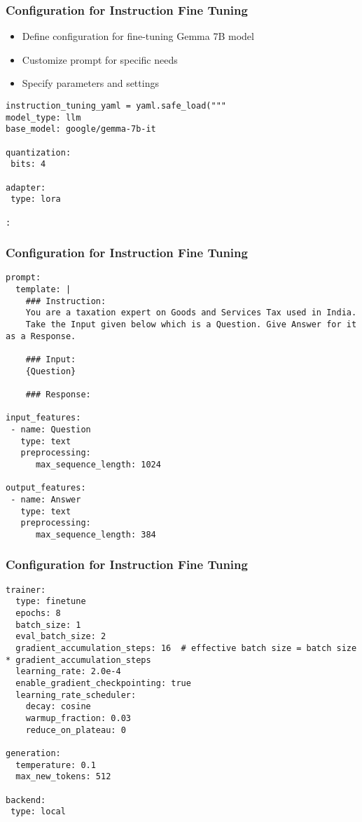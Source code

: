 \begin{frame}[fragile]\frametitle{Configuration for Instruction Fine Tuning}
\begin{itemize}
\item Define configuration for fine-tuning Gemma 7B model
\item Customize prompt for specific needs
\item Specify parameters and settings
\end{itemize}

\begin{lstlisting}
instruction_tuning_yaml = yaml.safe_load("""
model_type: llm
base_model: google/gemma-7b-it

quantization:
 bits: 4
 
adapter:
 type: lora
 
:
\end{lstlisting}


\end{frame}

\begin{frame}[fragile]\frametitle{Configuration for Instruction Fine Tuning}

\begin{lstlisting}
prompt:
  template: |
    ### Instruction:
    You are a taxation expert on Goods and Services Tax used in India.
    Take the Input given below which is a Question. Give Answer for it as a Response.

    ### Input:
    {Question}

    ### Response:

input_features:
 - name: Question
   type: text
   preprocessing:
      max_sequence_length: 1024

output_features:
 - name: Answer
   type: text
   preprocessing:
      max_sequence_length: 384
\end{lstlisting}
\end{frame}

\begin{frame}[fragile]\frametitle{Configuration for Instruction Fine Tuning}

\begin{lstlisting}
trainer:
  type: finetune
  epochs: 8
  batch_size: 1
  eval_batch_size: 2
  gradient_accumulation_steps: 16  # effective batch size = batch size * gradient_accumulation_steps
  learning_rate: 2.0e-4
  enable_gradient_checkpointing: true
  learning_rate_scheduler:
    decay: cosine
    warmup_fraction: 0.03
    reduce_on_plateau: 0

generation:
  temperature: 0.1
  max_new_tokens: 512

backend:
 type: local
\end{lstlisting}
\end{frame}

